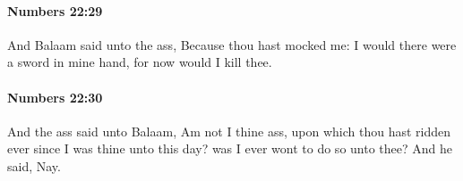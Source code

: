		\paragraph{Numbers 22:29} %
			\label{NUMBERS-22-29}

			And Balaam said unto the ass, Because thou hast mocked me: I would there were a sword in mine hand, for now would I kill thee.


		\paragraph{Numbers 22:30} %
			\label{NUMBERS-22-30}

			And the ass said unto Balaam, Am not I thine ass, upon which thou hast ridden ever since I was thine unto this day? was I ever wont to do so unto thee? And he said, Nay.



